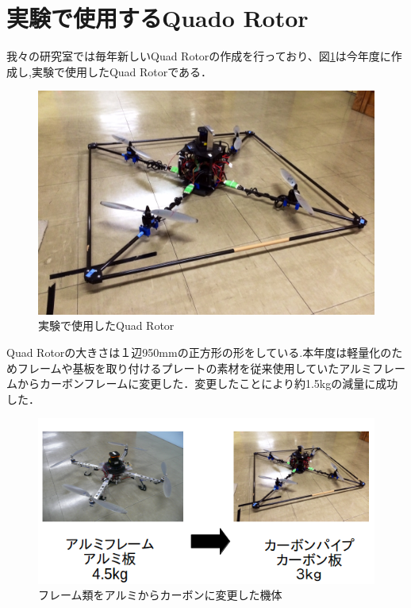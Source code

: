 \documentclass[12pt,oneside]{sotsuken_paper}
\begin{document}
\section{実験で使用するQuado Rotor}我々の研究室では毎年新しいQuad Rotorの作成を行っており、図\ref{fig:1}は今年度に作成し,実験で使用したQuad Rotorである．

\begin{figure}[H]
\begin{center}
\includegraphics[width=130mm]{img/1.jpg}
\end{center}
\caption{実験で使用したQuad Rotor}
\label{fig:1}
\end{figure}

Quad Rotorの大きさは１辺950mmの正方形の形をしている.本年度は軽量化のためフレームや基板を取り付けるプレートの素材を従来使用していたアルミフレームからカーボンフレームに変更した．変更したことにより約1.5kgの減量に成功した．

\begin{figure}[H]
\begin{center}
\includegraphics[width=140mm]{img/omosa.png}
\end{center}
\caption{フレーム類をアルミからカーボンに変更した機体}
\label{fig:omosa.jpg}
\end{figure}
\end{document}
